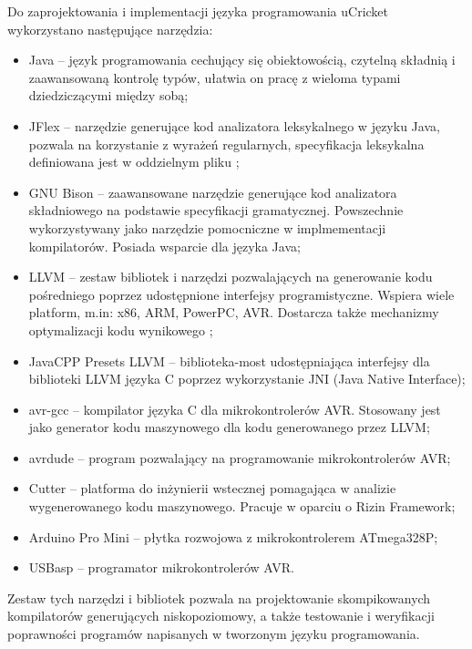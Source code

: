 Do zaprojektowania i implementacji języka programowania uCricket wykorzystano następujące narzędzia:
\begin{itemize}
\item Java -- język programowania cechujący się obiektowością, czytelną składnią i zaawansowaną kontrolę typów, ułatwia on pracę z wieloma typami dziedziczącymi między sobą;
\item JFlex -- narzędzie generujące kod analizatora leksykalnego w języku Java, pozwala na korzystanie z wyrażeń regularnych, specyfikacja leksykalna definiowana jest w oddzielnym pliku \cite{JFlexFeatures};
\item GNU Bison -- zaawansowane narzędzie generujące kod analizatora składniowego na podstawie specyfikacji gramatycznej. Powszechnie wykorzystywany jako narzędzie pomocniczne w implmementacji kompilatorów. Posiada wsparcie dla języka Java;
\item LLVM -- zestaw bibliotek i narzędzi pozwalających na generowanie kodu pośredniego poprzez udostępnione interfejsy programistyczne. Wspiera wiele platform, m.in: x86, ARM, PowerPC, AVR. Dostarcza także mechanizmy optymalizacji kodu wynikowego \cite{LLVMCompilerInfrastructurea};
\item JavaCPP Presets LLVM -- biblioteka-most udostępniająca interfejsy dla biblioteki LLVM języka C poprzez wykorzystanie JNI (Java Native Interface);
\item avr-gcc -- kompilator języka C dla mikrokontrolerów AVR. Stosowany jest jako generator kodu maszynowego dla kodu generowanego przez LLVM;
\item avrdude -- program pozwalający na programowanie mikrokontrolerów AVR;
\item Cutter -- platforma do inżynierii wstecznej pomagająca w analizie wygenerowanego kodu maszynowego. Pracuje w oparciu o Rizin Framework;
\item Arduino Pro Mini -- płytka rozwojowa z mikrokontrolerem ATmega328P;
\item USBasp -- programator mikrokontrolerów AVR.
\end{itemize}

Zestaw tych narzędzi i bibliotek pozwala na projektowanie skompikowanych kompilatorów generujących niskopoziomowy, a także testowanie i weryfikacji poprawności programów napisanych w tworzonym języku programowania.

%